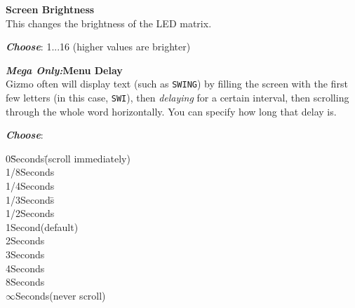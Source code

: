 \documentclass{article}
\begin{document}
\begin{description}
\hspace{\fill}\vspace{-1.5em}

	\item{\bf Screen Brightness}\\
		This changes the brightness of the LED matrix.
		\begin{description}
		\item{\bf \textit{Choose}}: 1...16 (higher values are brighter)
		\end{description}
		
		
	\item{\bf \textit{Mega Only:}\quad Menu Delay}\\
		Gizmo often will display text (such as \texttt{SWING}) by filling the screen with the first few letters (in this case, \texttt{SWI}), then {\it delaying} for a certain interval, then scrolling through the whole word horizontally. You can specify how long that delay is.
	
		
		\begin{description}
			\item{\bf \textit{Choose}}:
			\begin{tabbing}
			0\hspace{2em}\=Seconds\hspace{1in}\=(scroll immediately)\\
			1/8\>Seconds\\
			1/4\>Seconds\\
			1/3\>Seconds\>\hspace{1.5in}\=\\
			1/2\>Seconds\\
			1\>Second\>(default)\\
			2\>Seconds\\
			3\>Seconds\\
			4\>Seconds\\
			8\>Seconds\\
			\(\infty\)\>Seconds\>(never scroll)\>
			\end{tabbing}
		\end{description}



\end{description}
\end{document}
